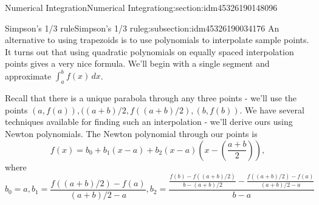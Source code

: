 \documentclass[oneside,10pt,]{article}
\numberwithin{equation}{section}
\numberwithin{equation}{section}
\begin{document}
\begin{sectionptx}{Numerical Integration}{}{Numerical Integration}{}{}{g:section:idm45326190148096}
%
\begin{subsectionptx}{Simpson's 1\slash{}3 rule}{}{Simpson's 1\slash{}3 rule}{}{}{g:subsection:idm45326190034176}
An alternative to using trapezoids is to use polynomials to interpolate sample points. It turns out that using quadratic polynomials on equally spaced interpolation points gives a very nice formula. We'll begin with a single segment and approximate \(\int_a^b f(x)\, dx\).%
\par
Recall that there is a unique parabola through any three points - we'll use the points \((a, f(a)), ((a+b)/2, f((a+b)/2), (b, f(b))\). We have several techniques available for finding such an interpolation - we'll derive ours using Newton polynomials. The Newton polynomial through our points is%
\begin{equation*}
f(x) = b_0 + b_1 (x - a) + b_2 (x -a) (x - (\frac{a+b}{2})),
\end{equation*}
where%
\begin{equation*}
b_0 = a, b_1 = \frac{f((a+b)/2) - f(a)}{(a + b)/2 - a}, b_2 = \frac{\frac{f(b) - f((a+b)/2)}{b - (a+b)/2} - \frac{f((a+b)/2) - f(a)}{(a+b)/2 - a}}{b - a}
\end{equation*}
%
\end{subsectionptx}
\end{sectionptx}
%
%
\typeout{************************************************}
\typeout{************************************************}
%
\end{document}
